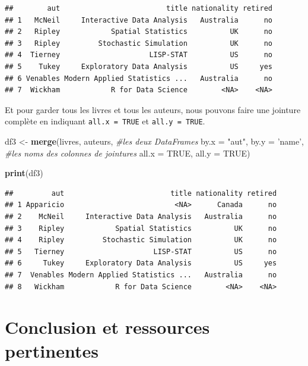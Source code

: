 \documentclass[
  11pt,
  french,
]{book}
\makeatletter
\newenvironment{Shaded}{\begin{snugshade}}{\end{snugshade}}
\newcommand{\CommentTok}[1]{\textcolor[rgb]{0.56,0.35,0.01}{\textit{#1}}}
\newcommand{\DataTypeTok}[1]{\textcolor[rgb]{0.13,0.29,0.53}{#1}}
\newcommand{\KeywordTok}[1]{\textcolor[rgb]{0.13,0.29,0.53}{\textbf{#1}}}
\newcommand{\NormalTok}[1]{#1}
\newcommand{\OtherTok}[1]{\textcolor[rgb]{0.56,0.35,0.01}{#1}}
\newcommand{\StringTok}[1]{\textcolor[rgb]{0.31,0.60,0.02}{#1}}
\newenvironment{kframe}{%
\medskip{}
\setlength{\fboxsep}{.8em}
 \def\at@end@of@kframe{}%
 \ifinner\ifhmode%
  \def\at@end@of@kframe{\end{minipage}}%
  \begin{minipage}{\columnwidth}%
 \fi\fi%
 \def\FrameCommand##1{\hskip\@totalleftmargin \hskip-\fboxsep
 \colorbox{shadecolor}{##1}\hskip-\fboxsep
     \hskip-\linewidth \hskip-\@totalleftmargin \hskip\columnwidth}%
 \MakeFramed {\advance\hsize-\width
   \@totalleftmargin\z@ \linewidth\hsize
   \@setminipage}}%
 {\par\unskip\endMakeFramed%
 \at@end@of@kframe}
\renewenvironment{Shaded}{\begin{kframe}}{\end{kframe}}
\makeatother
\begin{document}
\begin{verbatim}
##        aut                         title nationality retired
## 1   McNeil     Interactive Data Analysis   Australia      no
## 2   Ripley            Spatial Statistics          UK      no
## 3   Ripley         Stochastic Simulation          UK      no
## 4  Tierney                     LISP-STAT          US      no
## 5    Tukey     Exploratory Data Analysis          US     yes
## 6 Venables Modern Applied Statistics ...   Australia      no
## 7  Wickham            R for Data Science        <NA>    <NA>
\end{verbatim}

Et pour garder tous les livres et tous les auteurs, nous pouvons faire une jointure complète en indiquant \texttt{all.x\ =\ TRUE} et \texttt{all.y\ =\ TRUE}.

\begin{Shaded}
\begin{Highlighting}[]
\NormalTok{df3 <-}\StringTok{ }\KeywordTok{merge}\NormalTok{(livres, auteurs, }\CommentTok{#les deux DataFrames }
             \DataTypeTok{by.x =} \StringTok{"aut"}\NormalTok{, }\DataTypeTok{by.y =} \StringTok{'name'}\NormalTok{, }\CommentTok{#les noms des colonnes de jointures}
             \DataTypeTok{all.x =} \OtherTok{TRUE}\NormalTok{, }\DataTypeTok{all.y =} \OtherTok{TRUE}\NormalTok{)}

\KeywordTok{print}\NormalTok{(df3)}
\end{Highlighting}
\end{Shaded}

\begin{verbatim}
##         aut                         title nationality retired
## 1 Apparicio                          <NA>      Canada      no
## 2    McNeil     Interactive Data Analysis   Australia      no
## 3    Ripley            Spatial Statistics          UK      no
## 4    Ripley         Stochastic Simulation          UK      no
## 5   Tierney                     LISP-STAT          US      no
## 6     Tukey     Exploratory Data Analysis          US     yes
## 7  Venables Modern Applied Statistics ...   Australia      no
## 8   Wickham            R for Data Science        <NA>    <NA>
\end{verbatim}

\hypertarget{sect015}{%
\section{Conclusion et ressources pertinentes}\label{sect015}}
\end{document}
